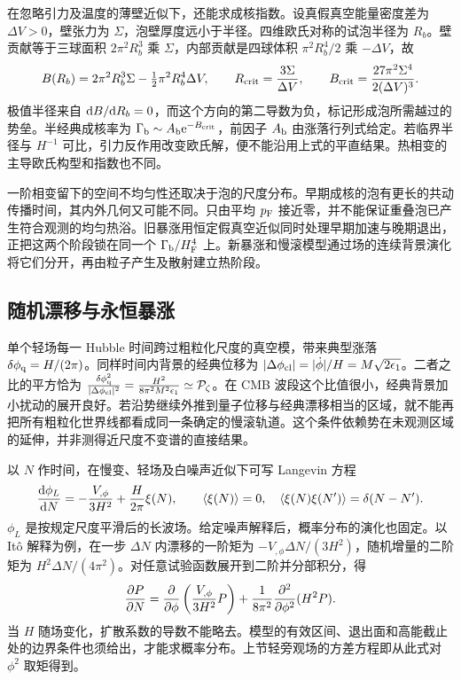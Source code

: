 在忽略引力及温度的薄壁近似下，还能求成核指数。设真假真空能量密度差为 $\Delta V>0$，壁张力为 $\Sigma$，泡壁厚度远小于半径。四维欧氏对称的试泡半径为 $R_b$。壁贡献等于三球面积 $2\pi^2R_b^3$ 乘 $\Sigma$，内部贡献是四球体积 $\pi^2R_b^4/2$ 乘 $-\Delta V$，故
\begin{equation}\label{eq:cosmo-inf-bubble-action}
 B(R_b)=2\pi^2R_b^3\Sigma-\tfrac12\pi^2R_b^4\Delta V,\qquad
 R_{\rm crit}=\frac{3\Sigma}{\Delta V},\qquad
 B_{\rm crit}=\frac{27\pi^2\Sigma^4}{2(\Delta V)^3}.
\end{equation}
极值半径来自 $\dd B/\dd R_b=0$，而这个方向的第二导数为负，标记形成泡所需越过的势垒。半经典成核率为 $\Gamma_{\rm b}\sim A_{\rm b}\mathrm{e}^{-B_{\rm crit}}$，前因子 $A_{\rm b}$ 由涨落行列式给定。若临界半径与 $H^{-1}$ 可比，引力反作用改变欧氏解，便不能沿用上式的平直结果。热相变的主导欧氏构型和指数也不同。

一阶相变留下的空间不均匀性还取决于泡的尺度分布。早期成核的泡有更长的共动传播时间，其内外几何又可能不同。只由平均 $p_{\rm F}$ 接近零，并不能保证重叠泡已产生符合观测的均匀热浴。旧暴涨用恒定假真空近似同时处理早期加速与晚期退出，正把这两个阶段锁在同一个 $\Gamma_{\rm b}/H_{\rm F}^4$ 上。新暴涨和慢滚模型通过场的连续背景演化将它们分开，再由粒子产生及散射建立热阶段。

\subsection{随机漂移与永恒暴涨}\label{sec:cosmo-inf-eternal}

单个轻场每一 Hubble 时间跨过粗粒化尺度的真空模，带来典型涨落 $\delta\phi_{\rm q}=H/(2\pi)$。同样时间内背景的经典位移为 $|\Delta\phi_{\rm cl}|=|\dot\phi|/H=M\sqrt{2\epsilon_1}$。二者之比的平方恰为 $\frac{\delta\phi_{\rm q}^2}{|\Delta\phi_{\rm cl}|^2} =\frac{H^2}{8\pi^2M^2\epsilon_1} \simeq\mathcal P_\zeta$。在 CMB 波段这个比值很小，经典背景加小扰动的展开良好。若沿势继续外推到量子位移与经典漂移相当的区域，就不能再把所有粗粒化世界线都看成同一条确定的慢滚轨道。这个条件依赖势在未观测区域的延伸，并非测得近尺度不变谱的直接结果。

以 $N$ 作时间，在慢变、轻场及白噪声近似下可写 Langevin 方程
\begin{equation}\label{eq:cosmo-inf-langevin}
 \frac{\dd\phi_L}{\dd N}
 =-\frac{V_{,\phi}}{3H^2}+\frac{H}{2\pi}\xi(N),
 \qquad
 \langle\xi(N)\rangle=0,\quad
 \langle\xi(N)\xi(N')\rangle=\delta(N-N').
\end{equation}
$\phi_L$ 是按规定尺度平滑后的长波场。给定噪声解释后，概率分布的演化也固定。以 It\^{o} 解释为例，在一步 $\Delta N$ 内漂移的一阶矩为 $-V_{,\phi}\Delta N/(3H^2)$，随机增量的二阶矩为 $H^2\Delta N/(4\pi^2)$。对任意试验函数展开到二阶并分部积分，得
\[
 \frac{\partial P}{\partial N}
 =\frac{\partial}{\partial\phi}\left(\frac{V_{,\phi}}{3H^2}P\right)
  +\frac1{8\pi^2}\frac{\partial^2}{\partial\phi^2}(H^2P).
\]
当 $H$ 随场变化，扩散系数的导数不能略去。模型的有效区间、退出面和高能截止处的边界条件也须给出，才能求概率分布。上节轻旁观场的方差方程即从此式对 $\phi^2$ 取矩得到。


